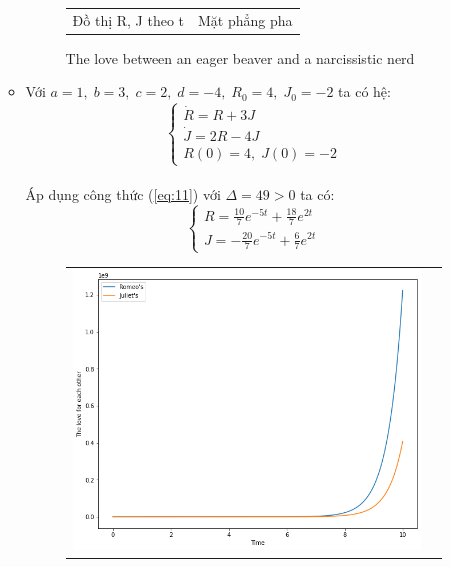 \documentclass[a4paper]{article}
\begin{document}
\begin{enumerate}
\begin{itemize}
\begin{figure}[htp]
\begin{tabular}{cc}
            Đồ thị R, J theo t & Mặt phẳng pha
        \end{tabular}
        \caption{The love between an eager beaver and a narcissistic nerd}
    \end{figure}
    \item Với $a = 1,\;b = 3,\;c = 2,\;d = -4,\;R_0 = 4,\;J_0 = -2$ ta có hệ:
    $$\begin{cases} \dot{R}=R+3J \\ \dot{J}=2R-4J \\ R(0)=4,\;J(0)=-2 \end{cases}$$ \\
    Áp dụng công thức (\ref{eq:11}) với $\Delta = 49 > 0$ ta có:
    $$\begin{cases}
        R = \frac{10}{7}e^{-5t} + \frac{18}{7}e^{2t} \\[3pt]
        J = -\frac{20}{7}e^{-5t} + \frac{6}{7}e^{2t}
    \end{cases}$$
    \begin{figure}[htp]
        \centering
        \begin{tabular}{cc}
            \includegraphics[scale = .33]{Images/Bt2/2.2_gr.png} &

\end{tabular}
\end{figure}
\end{itemize}
\end{enumerate}
\end{document}
